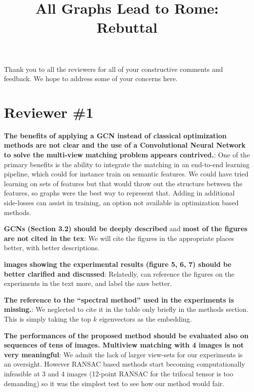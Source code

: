 \documentclass[10pt,twocolumn,letterpaper]{article}
\begin{document}
\title{All Graphs Lead to Rome: Rebuttal}  %

\maketitle
\thispagestyle{empty}


Thank you to all the reviewers for all of your constructive comments and feedback.
We hope to address some of your concerns here.

\section{Reviewer \#1}
\textbf{The benefits of applying a GCN instead of classical optimization methods are not clear and the use of a Convolutional Neural Network to solve the multi-view matching problem appears contrived.}:
One of the primary benefits is the ability to integrate the matching in an end-to-end learning pipeline, which could for instance train on semantic features. We could have tried learning on sets of features but that would throw out the structure between the features, so graphs were the best way to represent that. Adding in additional side-losses can assist in training, an option not available in optimization based methods. 

\textbf{GCNs (Section 3.2) should be deeply described} and \textbf{most of the figures are not cited in the tex}: 
We will cite the figures in the appropriate places better, with better descriptions.

\textbf{images showing the experimental results (figure 5, 6, 7) should be better clarified and discussed}: 
Relatedly, can reference the figures on the experiments in the text more, and label the axes better.

\textbf{The reference to the “spectral method” used in the experiments is missing.}: 
We neglected to cite it \cite{pachauri2013solving} in the table only briefly in the methods section. This is simply taking the top $k$ eigenvectors as the embedding.

\textbf{The performances of the proposed method should be evaluated also on sequences of tens of images. Multiview matching with 4 images is not very meaningful}: 
We admit the lack of larger view-sets for our experiments is an oversight. However RANSAC based methods start becoming computationally infeasible at 3 and 4 images (12-point RANSAC for the trifocal tensor is too demanding) so it was the simplest test to see how our method would fair.
\end{document}
